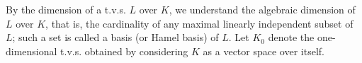By the dimension of a t.v.s. $L$ over $K$, we understand the algebraic dimension of $L$ over $K$, that is, the cardinality of any maximal linearly independent subset of $L$; such a set is called a basis (or Hamel basis) of $L$. Let $K_0$ denote the one-dimensional t.v.s. obtained by considering $K$ as a vector space over itself.
